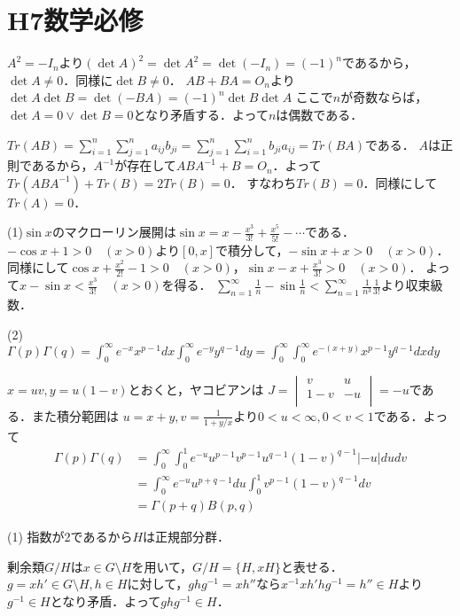 \documentclass[
		book,
		head_space=20mm,
		foot_space=20mm,
		gutter=10mm,
		line_length=190mm
]{jlreq}
\begin{document}
\section{H7数学必修}

$A^2=-I_n$より$(\det A)^2=\det A^2=\det (-I_n)=(-1)^n$であるから，$\det A \neq 0$．同様に$\det B \neq 0$．
$AB+BA=O_n$より$\det A \det B=\det(-BA)=(-1)^n\det B\det A$
ここで$n$が奇数ならば，$\det A=0 \lor \det B=0$となり矛盾する．よって$n$は偶数である．

$Tr(AB)=\sum_{i=1}^n \sum_{j=1}^n a_{ij}b_{ji}=\sum_{j=1}^n \sum_{i=1}^n b_{ji}a_{ij}=Tr(BA)$である．
$A$は正則であるから，$A^{-1}$が存在して$ABA^{-1}+B=O_n$．よって$Tr(ABA^{-1})+Tr(B)=2Tr(B)=0$．
すなわち$Tr(B)=0$．同様にして$Tr(A)=0$．

(1)$\sin x$のマクローリン展開は$\sin x=x-\frac{x^3}{3!}+\frac{x^5}{5!}-\cdots$である．
$-\cos x +1 >0\quad(x>0)$より$[0,x]$で積分して，$-\sin x +x >0 \quad(x>0)$．
同様にして$\cos x +\frac{x^2}{2!} -1>0\quad(x>0)$，$\sin x -x +\frac{x^3}{3!} >0\quad(x>0)$．
よって$x-\sin x <\frac{x^3}{3!} \quad(x>0)$を得る．
$\sum\limits_{n=1}^{\infty} \frac{1}{n}-\sin \frac{1}{n} < \sum\limits_{n=1}^{\infty} \frac{1}{n^3}\frac{1}{3!}$より収束級数．


(2)$\Gamma(p)\Gamma(q)=\int_0^\infty e^{-x}x^{p-1}dx\int_0^\infty e^{-y}y^{q-1}dy=\int_0^\infty \int_0^\infty e^{-(x+y)}x^{p-1}y^{q-1}dxdy$

$x=uv,y=u(1-v)$とおくと，ヤコビアンは
$J=\begin{vmatrix}
v & u \\
1-v & -u \\
\end{vmatrix}=-u$である．また積分範囲は
$u=x+y,v=\frac{1}{1+y/x}$より$0<u<\infty,0<v<1$である．よって
\begin{align}
	\Gamma(p)\Gamma(q)&=\int_0^\infty \int_0^1 e^{-u}u^{p-1}v^{p-1}u^{q-1}(1-v)^{q-1}|-u|dudv\\
	&=\int_0^\infty e^{-u}u^{p+q-1}du\int_0^1 v^{p-1}(1-v)^{q-1}dv\\
	&=\Gamma(p+q)B(p,q)
\end{align}

(1) 指数が2であるから$H$は正規部分群．
\begin{tcolorbox}[blanker,breakable,
left=3mm,right=3mm,
top=3mm,bottom=3mm,
before skip=15pt,after skip=15pt,
borderline vertical={1pt}{0pt}{black,dotted}]
剰余類$G/H$は$x\in G\setminus H$を用いて，$G/H=\{ H,xH\}$と表せる．
$g=xh' \in G\setminus H,h\in H$に対して，$ghg^{-1}=xh''$なら$x^{-1}xh'hg^{-1} =h''\in H$より$g^{-1}\in H$となり矛盾．よって$ghg^{-1}\in H$．
\end{tcolorbox}
\end{document}

